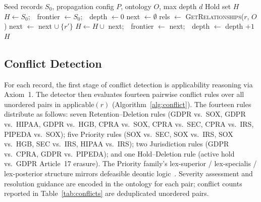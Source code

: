 \documentclass{ieeeaccess}
\begin{document}
\begin{algorithm}[t]
\caption{Semantic Hold Propagation}
\label{alg:propagation}
\begin{algorithmic}[1]
\Require Seed records $S_0$, propagation config $P$, ontology $O$, max depth $d$
\Ensure Hold set $H$
\State $H \gets S_0$;\ \ frontier $\gets S_0$;\ \ depth $\gets 0$
    \State next $\gets \emptyset$
        \State rels $\gets$ \textsc{GetRelationships}($r$, $O$)
                \State next $\gets$ next $\cup\ \{r'\}$
            \EndIf
        \EndFor
    \EndFor
    \State $H \gets H \cup$ next;\ \ frontier $\gets$ next;\ \ depth $\gets$ depth $+ 1$
\EndWhile
\State \Return $H$
\end{algorithmic}
\end{algorithm}

\subsection{Conflict Detection}

For each record, the first stage of conflict detection is applicability reasoning via Axiom~1. The detector then evaluates fourteen pairwise conflict rules over all unordered pairs in $\mathrm{applicable}(r)$ (Algorithm~\ref{alg:conflict}). The fourteen rules distribute as follows: seven Retention--Deletion rules (GDPR vs.\ SOX, GDPR vs.\ HIPAA, GDPR vs.\ HGB, CPRA vs.\ SOX, CPRA vs.\ SEC, CPRA vs.\ IRS, PIPEDA vs.\ SOX); five Priority rules (SOX vs.\ SEC, SOX vs.\ IRS, SOX vs.\ HGB, SEC vs.\ IRS, HIPAA vs.\ IRS); two Jurisdiction rules (GDPR vs.\ CPRA, GDPR vs.\ PIPEDA); and one Hold--Deletion rule (active hold vs.\ GDPR Article~17 erasure). The Priority family's lex-superior / lex-specialis / lex-posterior structure mirrors defeasible deontic logic~\cite{governatori2013}. Severity assessment and resolution guidance are encoded in the ontology for each pair; conflict counts reported in Table~\ref{tab:conflicts} are deduplicated unordered pairs.
\end{document}

